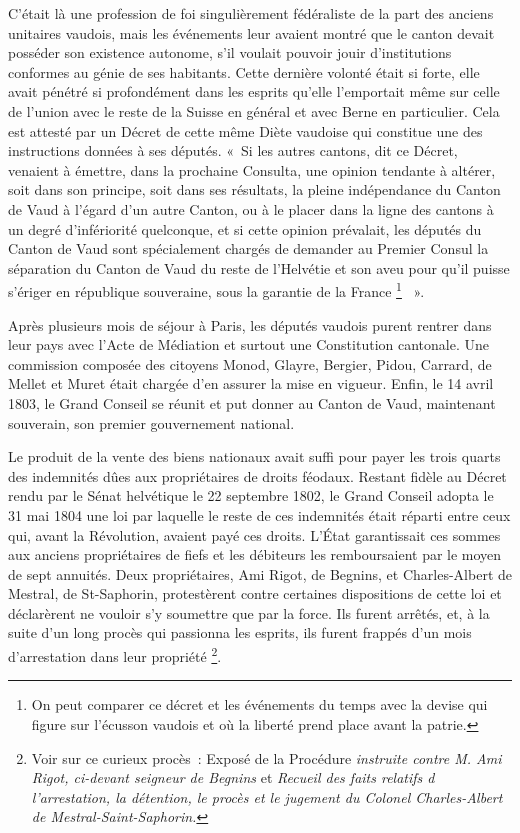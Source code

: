 \documentclass[french,twoside]{book} %
\begin{document}
\noindent C’était là une profession de foi singulièrement fédéraliste de la part des anciens unitaires vaudois, mais les événements leur avaient montré que le canton devait posséder son existence autonome, s’il voulait pouvoir jouir d’institutions conformes au génie de ses habitants. Cette dernière volonté était si forte, elle avait pénétré si profondément dans les esprits qu’elle l’emportait même sur celle de l’union avec le reste de la Suisse en général et avec Berne en particulier. Cela est attesté par un Décret de cette même Diète vaudoise qui constitue une des instructions données à ses députés. « Si les autres cantons, dit ce Décret, venaient à émettre, dans la prochaine Consulta, une opinion tendante à altérer, soit dans son principe, soit dans ses résultats, la pleine indépendance du Canton de Vaud à l’égard d’un autre Canton, ou à le placer dans la ligne des cantons à un degré d’infériorité quelconque, et si cette opinion prévalait, les députés du Canton de Vaud sont spécialement chargés de demander au Premier Consul la séparation du Canton de Vaud du reste de l’Helvétie et son aveu pour qu’il puisse s’ériger en république souveraine, sous la garantie de la France \footnote{On peut comparer ce décret et les événements du temps avec la devise qui figure sur l’écusson vaudois et où la liberté prend place avant la patrie.}  ».\par
Après plusieurs mois de séjour à Paris, les députés vaudois purent rentrer dans leur pays avec l’Acte de Médiation et surtout une Constitution cantonale. Une commission composée des citoyens Monod, Glayre, Bergier, Pidou, Carrard, de Mellet et Muret était chargée d’en assurer la mise en vigueur. Enfin, le 14 avril 1803, le Grand Conseil se réunit et put donner au Canton de Vaud, maintenant souverain, son premier gouvernement national.\par
Le produit de la vente des biens nationaux avait suffi pour payer les trois quarts des indemnités dûes aux propriétaires de droits féodaux. Restant fidèle au Décret rendu par le Sénat helvétique le 22 septembre 1802, le Grand Conseil adopta le 31 mai 1804 une loi par laquelle le reste de ces indemnités était réparti entre ceux qui, avant la Révolution, avaient payé ces droits. L’État garantissait ces sommes aux anciens propriétaires de fiefs et les débiteurs les remboursaient par le moyen de sept annuités. Deux propriétaires, Ami Rigot, de Begnins, et Charles-Albert de Mestral, de St-Saphorin, protestèrent contre certaines dispositions de cette loi et déclarèrent ne vouloir s’y soumettre que par la force. Ils furent arrêtés, et, à la suite d’un long procès qui passionna les esprits, ils furent frappés d’un mois d’arrestation dans leur propriété \footnote{Voir sur ce curieux procès : Exposé de la Procédure \emph{instruite contre M. Ami Rigot, ci-devant seigneur de Begnins} et \emph{Recueil des faits relatifs d l’arrestation, la détention, le procès et le jugement du Colonel Charles-Albert de Mestral-Saint-Saphorin.}}.\par
\end{document}
